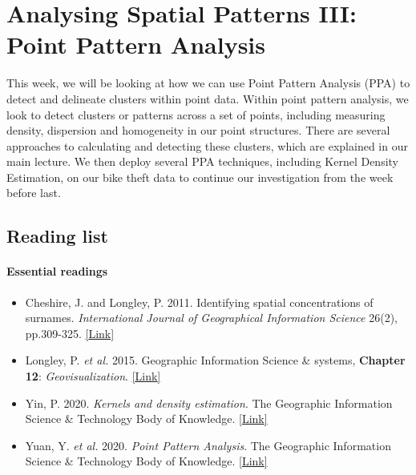\documentclass[
]{book}
\providecommand{\tightlist}{%
  \setlength{\itemsep}{0pt}\setlength{\parskip}{0pt}}
\begin{document}
\hypertarget{analysing-spatial-patterns-iii-point-pattern-analysis}{%
\chapter{Analysing Spatial Patterns III: Point Pattern Analysis}\label{analysing-spatial-patterns-iii-point-pattern-analysis}}

This week, we will be looking at how we can use Point Pattern Analysis (PPA) to detect and delineate clusters within point data. Within point pattern analysis, we look to detect clusters or patterns across a set of points, including measuring density, dispersion and homogeneity in our point structures. There are several approaches to calculating and detecting these clusters, which are explained in our main lecture. We then deploy several PPA techniques, including Kernel Density Estimation, on our bike theft data to continue our investigation from the week before last.

\hypertarget{reading-w08}{%
\section{Reading list}\label{reading-w08}}

\hypertarget{essential-readings-7}{%
\subsubsection*{Essential readings}\label{essential-readings-7}}

\begin{itemize}
\tightlist
\item
  Cheshire, J. and Longley, P. 2011. Identifying spatial concentrations of surnames. \emph{International Journal of Geographical Information Science} 26(2), pp.309-325. \href{https://doi.org/10.1080/13658816.2011.591291}{{[}Link{]}}
\item
  Longley, P. \emph{et al.} 2015. Geographic Information Science \& systems, \textbf{Chapter 12}: \emph{Geovisualization}. \href{https://rl.talis.com/3/ucl/items/fd38ec78-2bea-4165-aab3-0e9d9093db8e.html?lang=en-gb\&login=1}{{[}Link{]}}
\item
  Yin, P. 2020. \emph{Kernels and density estimation}. The Geographic Information Science \& Technology Body of Knowledge. \href{https://doi.org/10.22224/gistbok/2020.1.12}{{[}Link{]}}
\item
  Yuan, Y. \emph{et al.} 2020. \emph{Point Pattern Analysis}. The Geographic Information Science \& Technology Body of Knowledge. \href{https://doi.org/10.22224/gistbok/2020.1.13}{{[}Link{]}}
\end{itemize}
\end{document}
